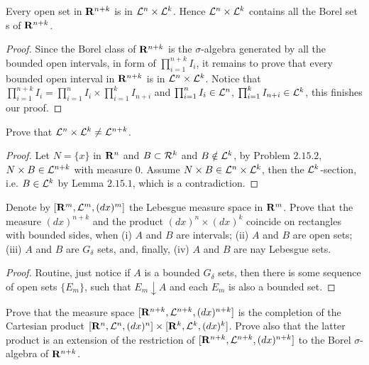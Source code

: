 \begin{pro}%
	Every open set in $\mathbf{R}^{n+k}$ is in $\mathcal{L}^n\times\mathcal{L}^k$. Hence $\mathcal{L}^n\times\mathcal{L}^k$ contains all the Borel set s of $\mathbf{R}^{n+k}$.
\end{pro}
\begin{proof}
	Since the Borel class of $\mathbf{R}^{n+k}$ is the $\sigma$-algebra generated by all the bounded open intervals, in form of $\prod_{i=1}^{n+k} I_i$, it remains to prove that every bounded open interval in $\mathbf{R}^{n+k}$ is in $\mathcal{L}^n\times\mathcal{L}^k$. Notice that $\prod_{i=1}^{n+k} I_i=\prod_{i=1}^{n} I_i\times\prod_{i=1}^k I_{n+i}$ and $\prod_{i=1}^{n} I_i\in\mathcal{L}^n$, $\prod_{i=1}^{k} I_{n+i}\in\mathcal{L}^k$, this finishes our proof.
\end{proof}

\begin{pro}%
	Prove that $\mathcal{L}^n\times\mathcal{L}^k\neq \mathcal{L}^{n+k}$.
\end{pro}
\begin{proof}
	Let $N=\{x\}$ in $\mathbf{R}^n$ and $B\subset\mathcal{R}^k$ and $B\notin\mathcal{L}^k$, by Problem $2.15.2$, $N\times B\in\mathcal{L}^{n+k}$ with measure 0. Assume $N\times B\in\mathcal{L}^n\times\mathcal{L}^k$, then the $\mathcal{L}^k$-section, i.e. $B\in \mathcal{L}^k$ by Lemma $2.15.1$, which is a contradiction.
\end{proof}

\begin{pro}%
	Denote by $[\mathbf{R}^m,\mathcal{L}^m,(dx)^m]$ the Lebesgue measure space in $\mathbf{R}^m$. Prove that the measure $(dx)^{n+k}$ and the product $(dx)^n\times(dx)^k$ coincide on rectangles with bounded sides, when (i) $A$ and $B$ are intervals; (ii) $A$ and $B$ are open sets; (iii) $A$ and $B$ are $G_{\delta}$ sets, and, finally, (iv) $A$ and $B$ are nay Lebesgue sets.
\end{pro}
\begin{proof}
	Routine, just notice if $A$ is a bounded $G_{\delta}$ sets, then there is some sequence of open sets $\{E_m\}$, such that $E_m\downarrow A$ and each $E_m$ is also a bounded set.
\end{proof}

\begin{pro}%
	Prove that the measure space $[\mathbf{R}^{n+k},\mathcal{L}^{n+k},(dx)^{n+k}]$ is the completion of the Cartesian product $[\mathbf{R}^n,\mathcal{L}^n,(dx)^n]\times [\mathbf{R}^k,\mathcal{L}^k,(dx)^k]$. Prove also that the latter product is an extension of the restriction of $[\mathbf{R}^{n+k},\mathcal{L}^{n+k},(dx)^{n+k}]$ to the Borel $\sigma$-algebra of $\mathbf{R}^{n+k}$.
\end{pro}

